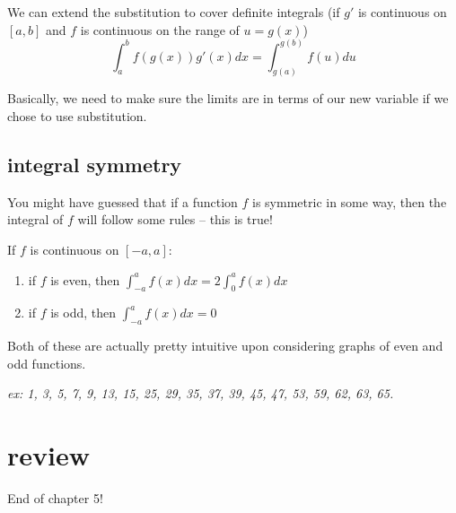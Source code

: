 \documentclass[10pt,a4paper]{report}
\begin{document}
We can extend the substitution to cover definite integrals (if $g'$ is continuous on $[a, b]$ and $f$ is continuous on the range of $u = g(x)$)
$$
	\int_a^b f(g(x))g'(x)dx = \int_{g(a)}^{g(b)} f(u) du
$$

Basically, we need to make sure the limits are in terms of our new variable if we chose to use substitution.

\subsection{integral symmetry}

You might have guessed that if a function $f$ is symmetric in some way, then the integral of $f$ will follow some rules -- this is true!

If $f$ is continuous on $[-a, a]$:

\begin{enumerate}
	\item if $f$ is even, then $\int_{-a}^{a} f(x)dx = 2 \int_0^a f(x) dx$
	\item if $f$ is odd, then $\int_{-a}^{a} f(x)dx = 0$
\end{enumerate}

Both of these are actually pretty intuitive upon considering graphs of even and odd functions.

\emph{ex: 1, 3, 5, 7, 9, 13, 15, 25, 29, 35, 37, 39, 45, 47, 53, 59, 62, 63, 65.}

\section*{review}

End of chapter 5!
\end{document}
